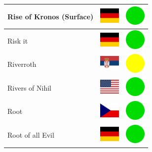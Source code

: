 \documentclass[12pt, a4paper, twoside]{report}
\begin{document}
\begin{center}
\begin{longtable}{|p{5cm}|p{2cm}|p{2cm}|}
 Rise of Kronos (Surface)                                   & \includegraphics[width=1cm]{4x3/de} &   \includegraphics[width=1cm]{likes/y} \\ \hline
 Risk it                                                    & \includegraphics[width=1cm]{4x3/de} &   \includegraphics[width=1cm]{likes/y} \\ \hline
 Riverroth                                                  & \includegraphics[width=1cm]{4x3/rs} &   \includegraphics[width=1cm]{likes/m} \\ \hline
 Rivers of Nihil                                            & \includegraphics[width=1cm]{4x3/us} &   \includegraphics[width=1cm]{likes/y} \\ \hline
 Root                                                       & \includegraphics[width=1cm]{4x3/cz} &   \includegraphics[width=1cm]{likes/y} \\ \hline
 Root of all Evil                                           & \includegraphics[width=1cm]{4x3/de} &   \includegraphics[width=1cm]{likes/y} \\ \hline

\end{longtable}
\end{center}
\end{document}
